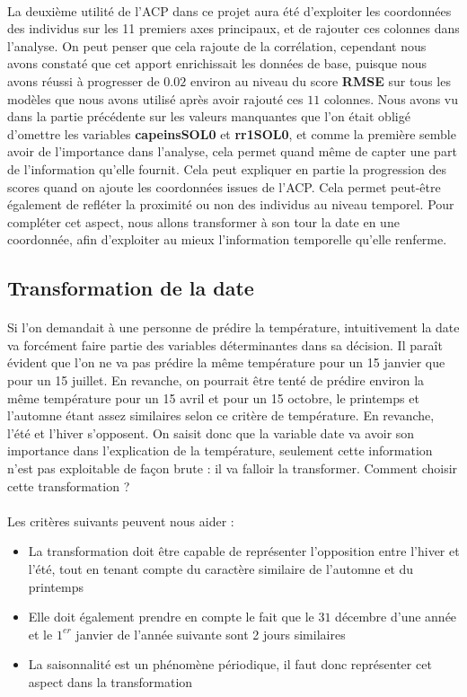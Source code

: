 \documentclass[14pt, openany]{article}
\begin{document}
\paragraph{}
La deuxième utilité de l'ACP dans ce projet aura été d'exploiter les coordonnées des individus sur les 11 premiers axes principaux, et de rajouter ces colonnes dans l'analyse. On peut penser que cela rajoute de la corrélation, cependant nous avons constaté que cet apport enrichissait les données de base, puisque nous avons réussi à progresser de $0.02$ environ au niveau du score \textbf{RMSE} sur tous les modèles que nous avons utilisé après avoir rajouté ces $11$ colonnes. Nous avons vu dans la partie précédente sur les valeurs manquantes que l'on était obligé d'omettre les variables \textbf{capeinsSOL0} et \textbf{rr1SOL0}, et comme la première semble avoir de l'importance dans l'analyse, cela permet quand même de capter une part de l'information qu'elle fournit. Cela peut expliquer en partie la progression des scores quand on ajoute les coordonnées issues de l'ACP. Cela permet peut-être également de refléter la proximité ou non des individus au niveau temporel. Pour compléter cet aspect, nous allons transformer à son tour la date en une coordonnée, afin d'exploiter au mieux l'information temporelle qu'elle renferme. 
\subsection{Transformation de la date}
\paragraph{}
Si l'on demandait à une personne de prédire la température, intuitivement la date va forcément faire partie des variables déterminantes dans sa décision. Il paraît évident que l'on ne va pas prédire la même température pour un 15 janvier que pour un 15 juillet. En revanche, on pourrait être tenté de prédire environ la même température pour un 15 avril et pour un 15 octobre, le printemps et l'automne étant assez similaires selon ce critère de température. En revanche, l'été et l'hiver s'opposent. On saisit donc que la variable date va avoir son importance dans l'explication de la température, seulement cette information n'est pas exploitable de façon brute : il va falloir la transformer. Comment choisir cette transformation ?\\
\paragraph{}
Les critères suivants peuvent nous aider :
\begin{itemize}
\item La transformation doit être capable de représenter l'opposition entre l'hiver et l'été, tout en tenant compte du caractère similaire de l'automne et du printemps
\item Elle doit également prendre en compte le fait que le $31$ décembre d'une année et le $1^{er}$ janvier de l'année suivante sont 2 jours similaires
\item La saisonnalité est un phénomène périodique, il faut donc représenter cet aspect dans la transformation
\end{itemize}
\end{document}
